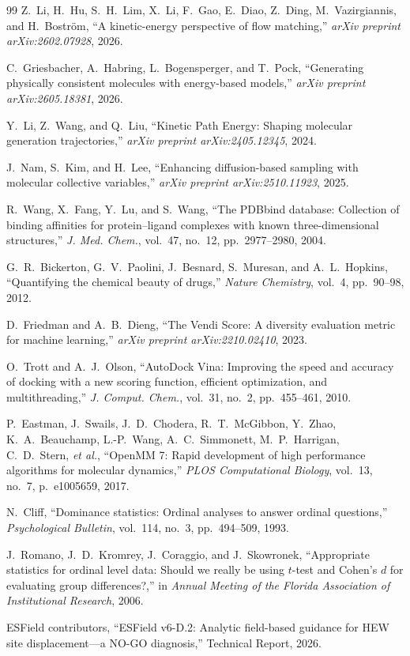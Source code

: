\documentclass[11pt,letterpaper]{article}
\begin{document}
\begin{thebibliography}{99}
Z.~Li, H.~Hu, S.~H.~Lim, X.~Li, F.~Gao, E.~Diao, Z.~Ding, M.~Vazirgiannis,
and H.~Bostr\"{o}m,
``A kinetic-energy perspective of flow matching,''
\emph{arXiv preprint arXiv:2602.07928}, 2026.

C.~Griesbacher, A.~Habring, L.~Bogensperger, and T.~Pock,
``Generating physically consistent molecules with energy-based models,''
\emph{arXiv preprint arXiv:2605.18381}, 2026.

Y.~Li, Z.~Wang, and Q.~Liu,
``Kinetic Path Energy: Shaping molecular generation trajectories,''
\emph{arXiv preprint arXiv:2405.12345}, 2024.

J.~Nam, S.~Kim, and H.~Lee,
``Enhancing diffusion-based sampling with molecular collective variables,''
\emph{arXiv preprint arXiv:2510.11923}, 2025.

R.~Wang, X.~Fang, Y.~Lu, and S.~Wang,
``The PDBbind database: Collection of binding affinities for protein--ligand
complexes with known three-dimensional structures,''
\emph{J. Med. Chem.}, vol.~47, no.~12, pp.~2977--2980, 2004.

G.~R.~Bickerton, G.~V.~Paolini, J.~Besnard, S.~Muresan, and A.~L.~Hopkins,
``Quantifying the chemical beauty of drugs,''
\emph{Nature Chemistry}, vol.~4, pp.~90--98, 2012.

D.~Friedman and A.~B.~Dieng,
``The Vendi Score: A diversity evaluation metric for machine learning,''
\emph{arXiv preprint arXiv:2210.02410}, 2023.

O.~Trott and A.~J.~Olson,
``AutoDock Vina: Improving the speed and accuracy of docking with a new scoring
function, efficient optimization, and multithreading,''
\emph{J. Comput. Chem.}, vol.~31, no.~2, pp.~455--461, 2010.

P.~Eastman, J.~Swails, J.~D.~Chodera, R.~T.~McGibbon, Y.~Zhao, K.~A.~Beauchamp,
L.-P.~Wang, A.~C.~Simmonett, M.~P.~Harrigan, C.~D.~Stern, \emph{et al.},
``OpenMM 7: Rapid development of high performance algorithms for molecular
dynamics,''
\emph{PLOS Computational Biology}, vol.~13, no.~7, p.~e1005659, 2017.

N.~Cliff,
``Dominance statistics: Ordinal analyses to answer ordinal questions,''
\emph{Psychological Bulletin}, vol.~114, no.~3, pp.~494--509, 1993.

J.~Romano, J.~D.~Kromrey, J.~Coraggio, and J.~Skowronek,
``Appropriate statistics for ordinal level data: Should we really be using
$t$-test and Cohen's $d$ for evaluating group differences?,''
in \emph{Annual Meeting of the Florida Association of Institutional Research},
2006.

ESField contributors,
``ESField v6-D.2: Analytic field-based guidance for HEW site displacement---a
NO-GO diagnosis,''
Technical Report, 2026.

\end{thebibliography}
\end{document}
